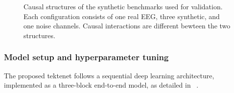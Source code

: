 \begin{figure}[H]
\centering
\subfloat[scale=0.5\textwidth][G1]{ \label{fig:te_g1}}
\subfloat[scale=0.5\textwidth][G2]{ \label{fig:te_g2}}
\caption{Causal structures of the synthetic benchmarks used for validation. Each configuration consists of one real EEG, three synthetic, and one noise channels. Causal interactions are different bewteen the two structures.}
\label{fig:te_g1_g2}
\end{figure}

\subsubsection{Model setup and hyperparameter tuning}\label{sec:hyperparam_setup}
The proposed \gls{tektenet} follows a sequential deep learning architecture, implemented as a three-block end-to-end model, as detailed in ~. 

